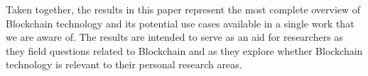 
Taken together, the results in this paper represent the most complete overview of Blockchain technology and its potential use cases available in a single work that we are aware of.
The results are intended to serve as an aid for researchers as they field questions related to Blockchain and as they explore whether Blockchain technology is relevant to their personal research areas.

	

